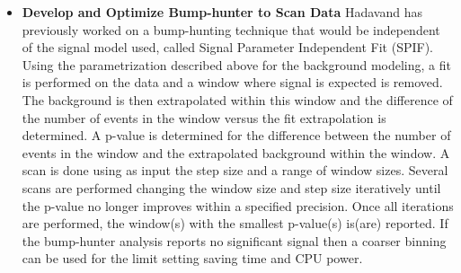 \begin{itemize}[noitemsep,nolistsep,leftmargin=*]
\item[]{{\bf Develop and Optimize Bump-hunter to Scan Data} %
Hadavand has previously worked on a bump-hunting technique that would be independent of the signal model used, called Signal Parameter Independent Fit (SPIF).  Using the parametrization described above for the background modeling, a fit is performed on the data and a window where signal is expected is removed.
The background is then extrapolated within this window and the difference of the number of events in the window versus the fit extrapolation is determined.  A p-value is determined for the difference between the number of events in the window and the extrapolated background within the window.
A scan is done using as input the step size and a range of window sizes.  Several scans are performed changing the window size and step size iteratively until the p-value no longer improves within a specified precision.
Once all iterations are performed, the window(s) with the smallest p-value(s) is(are) reported.  
If the bump-hunter analysis reports no significant signal then a coarser binning can be used for the limit setting saving time and CPU power.}

\end{itemize}



